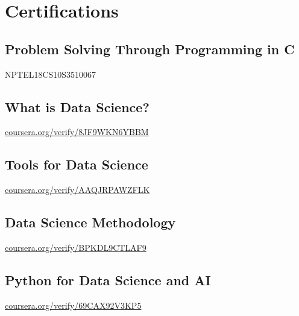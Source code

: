 \documentclass[]{deedy-resume-openfont}
\begin{document}
\begin{minipage}[t]{0.66\textwidth}

\section{Certifications} 
\sectionsep
\subsection{Problem Solving Through Programming in C}
NPTEL18CS10S3510067\\
\sectionsep

\sectionsep
\subsection{What is Data Science?}
\href{https://www.coursera.org/verify/8JF9WKN6YBBM}{coursera.org/verify/8JF9WKN6YBBM}\\
\sectionsep

\sectionsep
\subsection{Tools for Data Science}
\href{https://www.coursera.org/verify/AAQJRPAWZFLK}{coursera.org/verify/AAQJRPAWZFLK}\\
\sectionsep


\sectionsep
\subsection{Data Science Methodology}
\href{https://www.coursera.org/verify/BPKDL9CTLAF9}{coursera.org/verify/BPKDL9CTLAF9}\\
\sectionsep

\sectionsep
\subsection{Python for Data Science and AI}
\href{https://www.coursera.org/verify/69CAX92V3KP5}{coursera.org/verify/69CAX92V3KP5}\\
\sectionsep

\end{minipage} 
\end{document}
